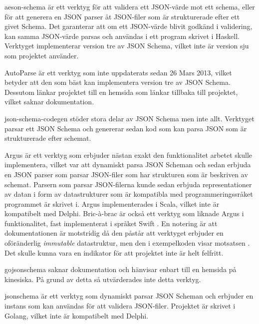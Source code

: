 aeson-schema är ett verktyg för att validera ett JSON-värde mot ett schema, eller för att generera en JSON parser åt JSON-filer som är strukturerade efter ett givet Schema. Det garanterar att om ett JSON-värde blivit godkänd i validering, kan samma JSON-värde parsas och användas i ett program skrivet i Haskell. Verktyget implementerar version tre av JSON Schema, vilket inte är version sju som projektet använder. \cite{Kowalczyk}

AutoParse är ett verktyg som inte uppdaterats sedan 26 Mars 2013, vilket betyder att den som bäst kan implementera version tre av JSON Schema. Dessutom länkar projektet till en hemsida som länkar tillbaka till projektet, vilket saknar dokumentation. \cite{Googleb}

json-schema-codegen stöder stora delar av JSON Schema men inte allt. Verktyget parsar ett JSON Schema och genererar sedan kod som kan parsa JSON som är strukturerade efter schemat. \cite{Tundra}

Argus är ett verktyg som erbjuder nästan exakt den funktionalitet arbetet skulle implementera, vilket var att dynamiskt parsa JSON Scheman och sedan erbjuda en JSON parser som parsar JSON-filer som har strukturen som är beskriven av schemat. Parsern som parsar JSON-filerna kunde sedan erbjuda representationer av datan i form av datastrukturer som är kompatibla med programmeringssråket programmet är skrivet i. Argus implementerades i Scala, vilket inte är kompatibelt med Delphi. \cite{Fenton} Bric-à-brac är också ett verktyg som liknade Argus i funktionalitet, fast implementerat i språket Swift \cite{GlimpseI/OInc}. En notering är att dokumentationen är motstridig då den påstår att verktyget erbjuder en oföränderlig \textit{immutable} datastruktur, men den i exempelkoden visar motsatsen \cite{GlimpseI/OInc}. Det skulle kunna vara en indikator för att projektet inte är helt felfritt.

gojsonschema saknar dokumentation och hänvisar enbart till en hemsida på kinesiska. På grund av detta så utvärderades inte detta verktyg. \cite{Zhangtao}

jsonschema är ett verktyg som dynamiskt parsar JSON Scheman och erbjuder en instans som kan användas för att validera JSON-filer. Projektet är skrivet i Golang, vilket inte är kompatibelt med Delphi. \cite{Qriinc.}


